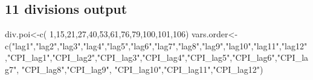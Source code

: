 \documentclass[
]{article}
\newenvironment{Shaded}{\begin{snugshade}}{\end{snugshade}}
\newcommand{\AttributeTok}[1]{\textcolor[rgb]{0.77,0.63,0.00}{#1}}
\newcommand{\ControlFlowTok}[1]{\textcolor[rgb]{0.13,0.29,0.53}{\textbf{#1}}}
\newcommand{\DecValTok}[1]{\textcolor[rgb]{0.00,0.00,0.81}{#1}}
\newcommand{\FunctionTok}[1]{\textcolor[rgb]{0.00,0.00,0.00}{#1}}
\newcommand{\NormalTok}[1]{#1}
\newcommand{\OtherTok}[1]{\textcolor[rgb]{0.56,0.35,0.01}{#1}}
\newcommand{\SpecialCharTok}[1]{\textcolor[rgb]{0.00,0.00,0.00}{#1}}
\newcommand{\StringTok}[1]{\textcolor[rgb]{0.31,0.60,0.02}{#1}}
\begin{document}
\begin{Shaded}
\end{Shaded}

\hypertarget{divisions-output}{%
\subsection{11 divisions output}\label{divisions-output}}

\begin{Shaded}
\begin{Highlighting}[]
\NormalTok{div.poi}\OtherTok{\textless{}{-}}\FunctionTok{c}\NormalTok{( }\DecValTok{1}\NormalTok{,}\DecValTok{15}\NormalTok{,}\DecValTok{21}\NormalTok{,}\DecValTok{27}\NormalTok{,}\DecValTok{40}\NormalTok{,}\DecValTok{53}\NormalTok{,}\DecValTok{61}\NormalTok{,}\DecValTok{76}\NormalTok{,}\DecValTok{79}\NormalTok{,}\DecValTok{100}\NormalTok{,}\DecValTok{101}\NormalTok{,}\DecValTok{106}\NormalTok{)}
\NormalTok{vars.order}\OtherTok{\textless{}{-}}\FunctionTok{c}\NormalTok{(}\StringTok{"lag1"}\NormalTok{,}\StringTok{"lag2"}\NormalTok{,}\StringTok{"lag3"}\NormalTok{,}\StringTok{"lag4"}\NormalTok{,}\StringTok{"lag5"}\NormalTok{,}\StringTok{"lag6"}\NormalTok{,}\StringTok{"lag7"}\NormalTok{,}\StringTok{"lag8"}\NormalTok{,}\StringTok{"lag9"}\NormalTok{,}\StringTok{"lag10"}\NormalTok{,}\StringTok{"lag11"}\NormalTok{,}\StringTok{"lag12"}\NormalTok{,}\StringTok{"CPI\_lag1"}\NormalTok{,}\StringTok{"CPI\_lag2"}\NormalTok{,}\StringTok{"CPI\_lag3"}\NormalTok{,}\StringTok{"CPI\_lag4"}\NormalTok{,}\StringTok{"CPI\_lag5"}\NormalTok{,}\StringTok{"CPI\_lag6"}\NormalTok{,}\StringTok{"CPI\_lag7"}\NormalTok{,}
                                             \StringTok{"CPI\_lag8"}\NormalTok{,}\StringTok{"CPI\_lag9"}\NormalTok{,}
                                             \StringTok{"CPI\_lag10"}\NormalTok{,}\StringTok{"CPI\_lag11"}\NormalTok{,}\StringTok{"CPI\_lag12"}\NormalTok{)}
\end{Highlighting}
\end{Shaded}
\end{document}
